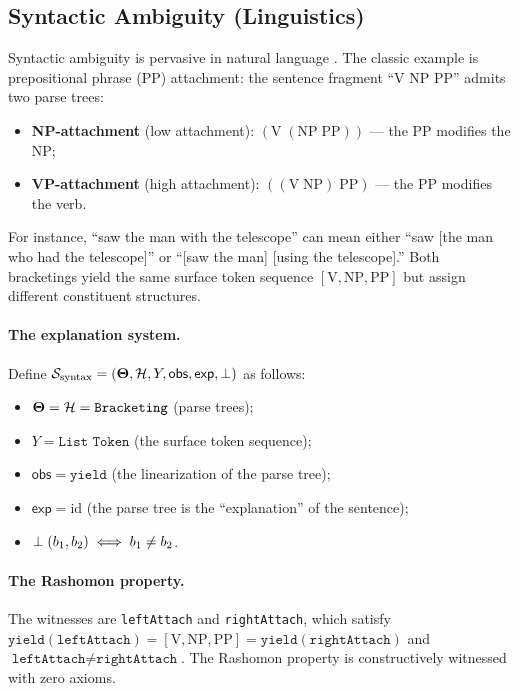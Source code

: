 \subsection{Syntactic Ambiguity (Linguistics)}
\label{sec:instance-syntax}

Syntactic ambiguity is pervasive in natural language
\citep{chomsky1957,jurafsky2024}.  The classic example is prepositional phrase
(PP) attachment: the sentence fragment ``V NP PP'' admits two parse trees:
\begin{itemize}
  \item \textbf{NP-attachment} (low attachment): $(\text{V}\;(\text{NP}\;\text{PP}))$
    --- the PP modifies the NP;
  \item \textbf{VP-attachment} (high attachment): $((\text{V}\;\text{NP})\;\text{PP})$
    --- the PP modifies the verb.
\end{itemize}
For instance, ``saw the man with the telescope'' can mean either ``saw
[the man who had the telescope]'' or ``[saw the man] [using the telescope].''
Both bracketings yield the same surface token sequence $[\text{V}, \text{NP},
\text{PP}]$ but assign different constituent structures.

\paragraph{The explanation system.}
Define $\mathcal{S}_{\mathrm{syntax}} = (\mathbf{\Theta}, \mathcal{H}, Y, \mathsf{obs},
\mathsf{exp}, \perp)$ as follows:
\begin{itemize}
  \item $\mathbf{\Theta} = \mathcal{H} = \texttt{Bracketing}$ (parse trees);
  \item $Y = \texttt{List Token}$ (the surface token sequence);
  \item $\mathsf{obs} = \texttt{yield}$ (the linearization of the parse tree);
  \item $\mathsf{exp} = \mathrm{id}$ (the parse tree is the ``explanation''
    of the sentence);
  \item $\perp(b_1, b_2) \iff b_1 \ne b_2$.
\end{itemize}

\paragraph{The Rashomon property.}
The witnesses are \texttt{leftAttach} and \texttt{rightAttach}, which satisfy
$\texttt{yield}(\texttt{leftAttach}) = [\text{V}, \text{NP}, \text{PP}] =
\texttt{yield}(\texttt{rightAttach})$ and
$\texttt{leftAttach} \ne \texttt{rightAttach}$.
The Rashomon property is constructively witnessed with zero axioms.

